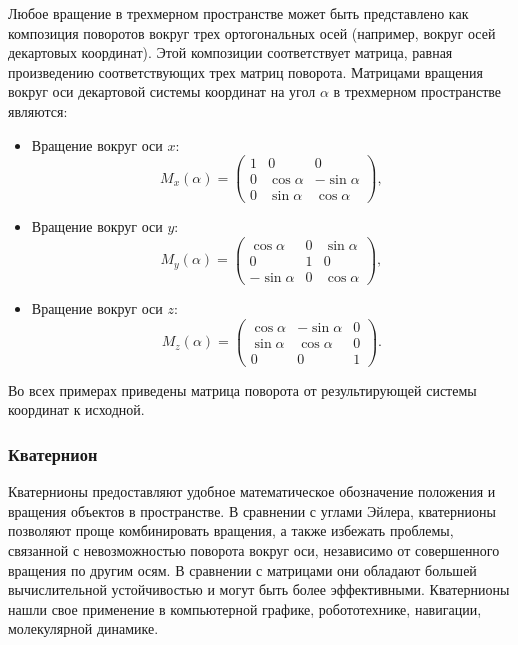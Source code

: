 Любое вращение в трехмерном пространстве может быть представлено как композиция поворотов вокруг
трех ортогональных осей (например, вокруг осей декартовых координат).
Этой композиции соответствует матрица, равная произведению соответствующих трех матриц поворота.
Матрицами вращения вокруг оси декартовой системы координат на угол $\alpha$ в трехмерном пространстве являются:
\begin{itemize}
  \item Вращение вокруг оси $x$:
  \begin{equation}
    M_x(\alpha) = \begin{pmatrix} 
		  1 & 0          & 0           \\
		  0 & \cos\alpha & -\sin\alpha \\
		  0 & \sin\alpha & \cos\alpha
		  \end{pmatrix},
  \end{equation}
  
  \item Вращение вокруг оси $y$:
  \begin{equation}  
    M_y(\alpha) = \begin{pmatrix} 
		  \cos\alpha  & 0 & \sin\alpha \\
		  0          & 1 & 0           \\
		 -\sin\alpha & 0 & \cos\alpha
		  \end{pmatrix},
  \end{equation}
  \item Вращение вокруг оси $z$:
  \begin{equation}
    M_z(\alpha) = \begin{pmatrix} 
		  \cos\alpha & -\sin\alpha & 0 \\
		  \sin\alpha & \cos\alpha  & 0 \\
		  0          & 0           & 1
		  \end{pmatrix}.
  \end{equation}
\end{itemize}
Во всех примерах приведены матрица поворота от результирующей системы координат к исходной.
  
\subsubsection{Кватернион}
Кватернионы предоставляют удобное математическое обозначение положения и вращения объектов в пространстве.
В сравнении с углами Эйлера, кватернионы позволяют проще комбинировать вращения, а также избежать проблемы,
связанной с невозможностью поворота вокруг оси, независимо от совершенного вращения по другим осям.
В сравнении с матрицами они обладают большей вычислительной устойчивостью и могут быть более эффективными.
Кватернионы нашли свое применение в компьютерной графике, робототехнике, навигации, молекулярной динамике.

